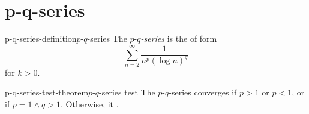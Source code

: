 \documentclass[preview]{standalone}
\begin{document}
\section{p-q-series}

\begin{snippetdefinition}{p-q-series-definition}{\(p\text{-}q\)-series}
    The \emph{\(p\text{-}q\)-series} is the \series of form
    \[\sum_{n=2}^\infty \frac{1}{n^p{(\log n)}^q}\]
    for \(k > 0\).
\end{snippetdefinition}

\begin{snippettheorem}{p-q-series-test-theorem}{\(p\text{-}q\)-series test}
    The \(p\text{-}q\)-series converges if \(p > 1\) or \(p<1\), or if \(p=1 \land q>1\).
    Otherwise, it \seriesdiverges.
\end{snippettheorem}
\end{document}
